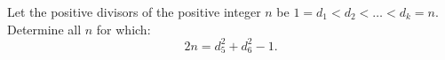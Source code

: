 Let the positive divisors of the positive integer $n$ be $1=d_1<d_2< \ldots <d_k=n$.
Determine all $n$ for which:
$$2n=d_5^2+d_6^2-1.$$